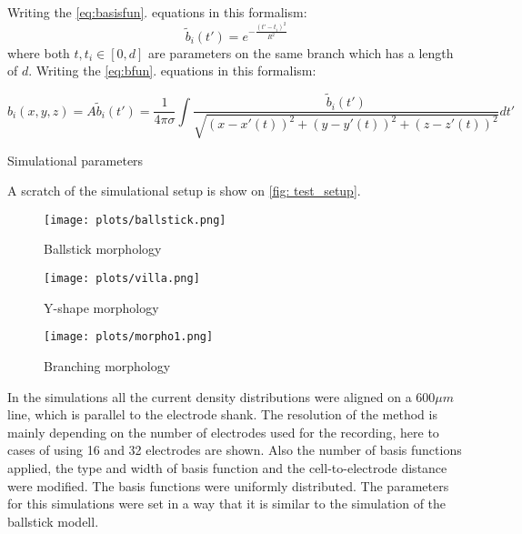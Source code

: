 \documentclass[12pt,a4paper]{article}
\begin{document}
Writing the \ref{eq:basisfun}. equations in this formalism:
\begin{equation}
\tilde{b}_i (t') = e^{- \frac{(t' - t_i)^2}{R^2}}
\end{equation}
where both $t,t_i \in \left[ 0, d \right] $ are parameters on the same branch which has a length of $d$. 
Writing the \ref{eq:bfun}. equations in this formalism:


\begin{equation}
b_i (x,y,z)= A \tilde{b}_i (t')= \frac{1}{4 \pi \sigma} \int 
\frac{ \tilde{b}_i (t')}{\sqrt{(x-x'(t))^2+(y-y'(t))^2+(z-z'(t))^2}} dt'
\end{equation}



Simulational parameters


A scratch of the simulational setup is show on \ref{fig: test_setup}.


\begin{figure}[h]
\centering
\begin{minipage}[b]{0.3\linewidth}
\texttt{[image: plots/ballstick.png]}
\caption{Ballstick morphology}
\label{fig: test_setup1}
\end{minipage}
\quad
\begin{minipage}[b]{0.3\linewidth}
\texttt{[image: plots/villa.png]}
\caption{Y-shape morphology}
\label{fig: test_setup2}
\end{minipage}
\quad
\begin{minipage}[b]{0.3\linewidth}
\texttt{[image: plots/morpho1.png]}
\caption{Branching morphology}
\label{fig: test_setup2}
\end{minipage}



\end{figure}


In the simulations all the current density distributions were aligned on a $600 \mu m$line, which is parallel to the electrode shank. The resolution of the method is mainly depending on the number of electrodes used for the recording, here to cases of using 16 and 32 electrodes are shown. Also the number of basis functions applied, the type and width of basis function and the cell-to-electrode distance were modified. The basis functions were uniformly distributed. The parameters for this simulations were set in a way that it is similar to the simulation of the ballstick modell.
\end{document}
